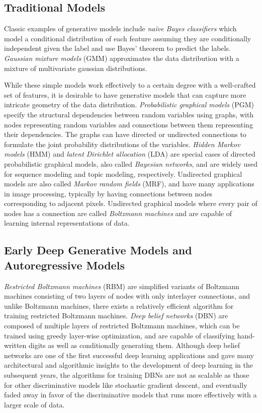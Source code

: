 \subsection{Traditional Models}

Classic examples of generative models include \emph{na\"{i}ve Bayes classifiers} \cite{maron1961naive} which model a conditional distribution of each feature assuming they are conditionally independent given the label and use Bayes' theorem to predict the labels.
\emph{Gaussian mixture models} (GMM) \cite{everitt1981mixture} approximates the data distribution with a mixture of multivariate gaussian distributions.

While these simple models work effectively to a certain degree with a well-crafted set of features, it is desirable to have generative models that can capture more intricate geometry of the data distribution.
\emph{Probabilistic graphical models} (PGM) specify the structural dependencies between random variables using graphs, with nodes representing random variables and connections between them representing their dependencies.
The graphs can have directed or undirected connections to formulate the joint probability distributions of the variables.
\emph{Hidden Markov models} (HMM) \cite{rabiner1989hmm} and \emph{latent Dirichlet allocation} (LDA) \cite{blei2003lda} are special cases of directed probabilistic graphical models, also called \emph{Bayesian networks}, and are widely used for sequence modeling and topic modeling, respectively.
Undirected graphical models are also called \emph{Markov random fields} (MRF), and have many applications in image processing, typically by having connections between nodes corresponding to adjacent pixels.
Undirected graphical models where every pair of nodes has a connection are called \emph{Boltzmann machines} and are capable of learning internal representations of data.

\subsection{Early Deep Generative Models and Autoregressive Models}

\emph{Restricted Boltzmann machines} (RBM) are simplified variants of Boltzmann machines consisting of two layers of nodes with only interlayer connections, and unlike Boltzmann machines, there exists a relatively efficient algorithm \cite{hinton2005cd} for training restricted Boltzmann machines.
\emph{Deep belief networks} (DBN) \cite{hinton2006dbn} are composed of multiple layers of restricted Boltzmann machines, which can be trained using greedy layer-wise optimization, and are capable of classifying hand-written digits as well as conditionally generating them.
Although deep belief networks are one of the first successful deep learning applications and gave many architectural and algorithmic insights to the development of deep learning in the subsequent years, the algorithms for training DBNs are not as scalable as those for other discriminative models like stochastic gradient descent, and eventually faded away in favor of the discriminative models that runs more effectively with a larger scale of data.

